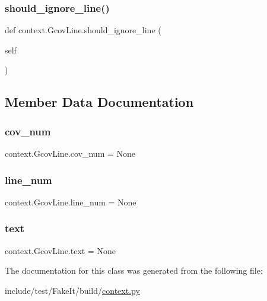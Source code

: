 \subsubsection{\texorpdfstring{should\_ignore\_line()}{should\_ignore\_line()}}
{\footnotesize\ttfamily def context.\+Gcov\+Line.\+should\+\_\+ignore\+\_\+line (\begin{DoxyParamCaption}\item[{}]{self }\end{DoxyParamCaption})}



\subsection{Member Data Documentation}
\mbox{\label{classcontext_1_1GcovLine_af5a1b3b0e1ae0809f765657d1f93325c}} 
\subsubsection{\texorpdfstring{cov\_num}{cov\_num}}
{\footnotesize\ttfamily context.\+Gcov\+Line.\+cov\+\_\+num = None\hspace{0.3cm}{\ttfamily [static]}}

\mbox{\label{classcontext_1_1GcovLine_af1cdc33968821862046e1b3168d4e300}} 
\subsubsection{\texorpdfstring{line\_num}{line\_num}}
{\footnotesize\ttfamily context.\+Gcov\+Line.\+line\+\_\+num = None\hspace{0.3cm}{\ttfamily [static]}}

\mbox{\label{classcontext_1_1GcovLine_ad7a672e0f1662f04bf750626b3cc3d2f}} 
\subsubsection{\texorpdfstring{text}{text}}
{\footnotesize\ttfamily context.\+Gcov\+Line.\+text = None\hspace{0.3cm}{\ttfamily [static]}}



The documentation for this class was generated from the following file\+:\begin{DoxyCompactItemize}
\item 
include/test/\+Fake\+It/build/\mbox{\hyperlink{context_8py}{context.\+py}}\end{DoxyCompactItemize}
